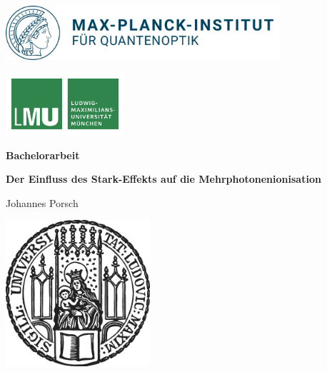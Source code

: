 \begin{titlepage}
    \centering
    
    \begin{minipage}{0.5\textwidth}
        \includegraphics[height=2cm]{figures/mpq.png}
    \end{minipage}
    \hfill
    \begin{minipage}{0.3\textwidth}
        \includegraphics[height=2.3cm]{figures/lmu-logo.pdf}
    \end{minipage}

    
    \vspace{1.7cm}

    {\Large \bfseries Bachelorarbeit}

    \vspace{0.5cm}
    
    {\huge\bfseries Der Einfluss des Stark-Effekts auf die Mehrphotonenionisation\\[0.4cm]}
    
    \vspace{0.7cm}
    
    {\Large Johannes Porsch}
    
    \vspace{0.8cm}
    
    \vfill
    
    \includegraphics[width = 0.4\textwidth]{figures/sigillum.png}


\end{titlepage}
